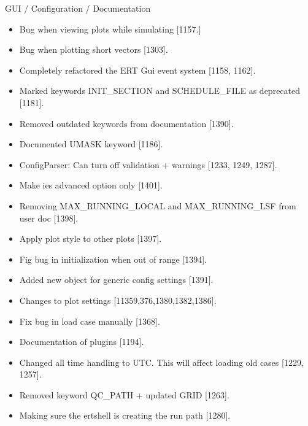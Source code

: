 \documentclass[letterpaper,10pt,english]{sphinxmanual}
\begin{document}
GUI / Configuration / Documentation
\begin{itemize}
\item {} 
Bug when viewing plots while simulating {[}1157.{]}

\item {} 
Bug when plotting short vectors {[}1303{]}.

\item {} 
Completely refactored the ERT Gui event system {[}1158, 1162{]}.

\item {} 
Marked keywords INIT\_SECTION and SCHEDULE\_FILE as deprecated {[}1181{]}.

\item {} 
Removed outdated keywords from documentation {[}1390{]}.

\item {} 
Documented UMASK keyword {[}1186{]}.

\item {} 
ConfigParser: Can turn off validation + warnings {[}1233, 1249, 1287{]}.

\item {} 
Make ies advanced option only {[}1401{]}.

\item {} 
Removing MAX\_RUNNING\_LOCAL and MAX\_RUNNING\_LSF from user doc {[}1398{]}.

\item {} 
Apply plot style to other plots {[}1397{]}.

\item {} 
Fig bug in initialization when out of range {[}1394{]}.

\item {} 
Added new object for generic config settings {[}1391{]}.

\item {} 
Changes to plot settings {[}11359,376,1380,1382,1386{]}.

\item {} 
Fix bug in load case manually {[}1368{]}.

\item {} 
Documentation of plugins {[}1194{]}.

\item {} 
Changed all time handling to UTC. This will affect loading old cases {[}1229, 1257{]}.

\item {} 
Removed keyword QC\_PATH + updated GRID {[}1263{]}.

\item {} 
Making sure the ertshell is creating the run path {[}1280{]}.


\end{itemize}
\end{document}
